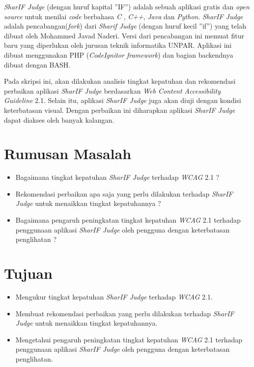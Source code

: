 \textit{SharIF Judge} \cite{SharIF_Judge} (dengan huruf kapital ''IF'') adalah sebuah aplikasi gratis dan \textit{open source} untuk menilai \textit{code} berbahasa \textit{C} , \textit{C++}, \textit{Java} dan \textit{Python}. \textit{SharIF Judge} adalah pencabangan(\textit{fork}) dari \textit{Sharif Judge} \cite{Sharif_Judge_Original} (dengan huruf kecil ''if'') yang telah dibuat oleh Mohammed Javad Naderi. Versi dari pencabangan ini memuat fitur baru yang diperlukan oleh jurusan teknik informatika UNPAR. Aplikasi ini dibuat menggunakan PHP (\textit{CodeIgnitor framework})\cite{Codeigniter} dan bagian backendnya dibuat dengan BASH.

Pada skripsi ini, akan dilakukan analisis tingkat kepatuhan dan rekomendasi perbaikan aplikasi \textit{SharIF Judge} berdasarkan \textit{Web Content Accessibility Guideline} 2.1. Selain itu, aplikasi \textit{SharIF Judge} juga akan diuji dengan kondisi keterbatasan visual. Dengan perbaikan ini diharapkan aplikasi \textit{SharIF Judge} dapat diakses oleh banyak kalangan.

\section{Rumusan Masalah}
\label{sec:rumusan}
\begin{itemize}
	\item Bagaimana tingkat kepatuhan \textit{SharIF Judge} terhadap \textit{WCAG} 2.1 ?
	\item Rekomendasi perbaikan apa saja yang perlu dilakukan terhadap \textit{SharIF Judge} untuk menaikkan tingkat kepatuhannya ?
	\item Bagaimana pengaruh peningkatan tingkat kepatuhan \textit{WCAG} 2.1 terhadap penggunaan aplikasi \textit{SharIF Judge} oleh pengguna dengan keterbatasan penglihatan ?
\end{itemize}

\section{Tujuan}
\label{sec:tujuan}
\begin{itemize}
	\item Mengukur tingkat kepatuhan \textit{SharIF Judge} terhadap \textit{WCAG} 2.1.
	\item Membuat rekomendasi perbaikan yang perlu dilakukan terhadap \textit{SharIF Judge} untuk menaikkan tingkat kepatuhannya.
	\item Mengetahui pengaruh peningkatan tingkat kepatuhan \textit{WCAG} 2.1 terhadap penggunaan aplikasi \textit{SharIF Judge} oleh pengguna dengan keterbatasan penglihatan.
\end{itemize} 

